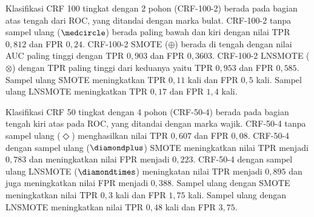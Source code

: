 Klasifikasi CRF 100 tingkat dengan 2 pohon (CRF-100-2) berada pada bagian atas
tengah dari ROC, yang ditandai dengan marka bulat.
CRF-100-2 tanpa sampel ulang ($\medcircle$) berada paling bawah dan kiri dengan
nilai TPR $0,812$ dan FPR $0,24$.
CRF-100-2 SMOTE ($\oplus$) berada di tengah dengan nilai AUC paling tinggi
dengan TPR $0,903$ dan FPR $0,3603$.
CRF-100-2 LNSMOTE ($\otimes$) dengan TPR paling tinggi dari keduanya yaitu TPR
$0,953$ dan FPR $0,585$.
Sampel ulang SMOTE meningkatkan TPR $0,11$ kali dan FPR $0,5$ kali.
Sampel ulang LNSMOTE meningkatkan TPR $0,17$ dan FPR $1,4$ kali.

Klasifikasi CRF 50 tingkat dengan 4 pohon (CRF-50-4) berada pada bagian tengah
kiri atas pada ROC, yang ditandai dengan marka wajik.
CRF-50-4 tanpa sampel ulang ($\Diamond$) menghasilkan nilai TPR $0,607$ dan FPR
$0,08$.
CRF-50-4 dengan sampel ulang ($\diamondplus$) SMOTE meningkatkan nilai TPR
menjadi $0,783$ dan meningkatkan nilai FPR menjadi $0,223$.
CRF-50-4 dengan sampel ulang LNSMOTE ($\diamondtimes$) meningkatan nilai TPR
menjadi $0,895$ dan juga meningkatkan nilai FPR menjadi $0,388$.
Sampel ulang dengan SMOTE meningkatkan nilai TPR $0,3$ kali dan FPR $1,75$
kali.
Sampel ulang dengan LNSMOTE meningkatkan nilai TPR $0,48$ kali dan FPR $3,75$.


